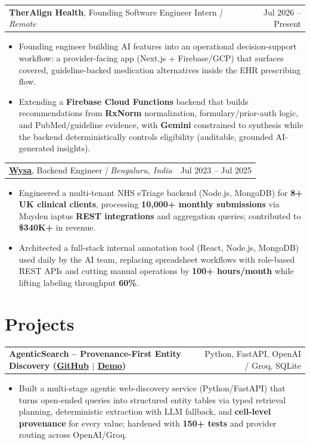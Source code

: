 \documentclass[letterpaper,11pt]{article}
\makeatletter
\newcommand{\expItem}[4]{%
  \vspace{2pt}
  \begin{tabular*}{\textwidth}{@{}l@{\extracolsep{\fill}}r@{}}
    \textbf{#1}, #2 \textit{| #3} & #4 \\
  \end{tabular*}\par\vspace{-3pt}
}
\newcommand{\projItem}[2]{%
  \vspace{2pt}
  \begin{tabular*}{\textwidth}{@{}l@{\extracolsep{\fill}}r@{}}
    \textbf{#1} & #2 \\
  \end{tabular*}\par\vspace{-3pt}
}
\makeatother
\begin{document}
\expItem{TherAlign Health}{Founding Software Engineer Intern}{Remote}{Jul 2026 -- Present}
\begin{itemize}
  \item Founding engineer building AI features into an operational decision-support workflow: a provider-facing app (Next.js + Firebase/GCP) that surfaces covered, guideline-backed medication alternatives inside the EHR prescribing flow.
  \item Extending a \textbf{Firebase Cloud Functions} backend that builds recommendations from \textbf{RxNorm} normalization, formulary/prior-auth logic, and PubMed/guideline evidence, with \textbf{Gemini} constrained to synthesis while the backend deterministically controls eligibility (auditable, grounded AI-generated insights).
\end{itemize}

\expItem{\href{https://www.wysa.io}{Wysa}}{Backend Engineer}{Bengaluru, India}{Jul 2023 -- Jul 2025}
\begin{itemize}
  \item Engineered a multi-tenant NHS eTriage backend (Node.js, MongoDB) for \textbf{8+ UK clinical clients}, processing \textbf{10{,}000+ monthly submissions} via Mayden iaptus \textbf{REST integrations} and aggregation queries; contributed to \textbf{\$340K+} in revenue.
  \item Architected a full-stack internal annotation tool (React, Node.js, MongoDB) used daily by the AI team, replacing spreadsheet workflows with role-based REST APIs and cutting manual operations by \textbf{100+ hours/month} while lifting labeling throughput \textbf{60\%}.
\end{itemize}

\section{Projects}

\projItem{AgenticSearch -- Provenance-First Entity Discovery {\normalfont\small(\href{https://github.com/Deva-1903/ciir_agentic_search}{GitHub} $\vert$ \href{https://agentic-search-negglszkwa-uc.a.run.app}{Demo})}}{Python, FastAPI, OpenAI / Groq, SQLite}
\begin{itemize}
  \item Built a multi-stage agentic web-discovery service (Python/FastAPI) that turns open-ended queries into structured entity tables via typed retrieval planning, deterministic extraction with LLM fallback, and \textbf{cell-level provenance} for every value; hardened with \textbf{150+ tests} and provider routing across OpenAI/Groq.
\end{itemize}
\end{document}
